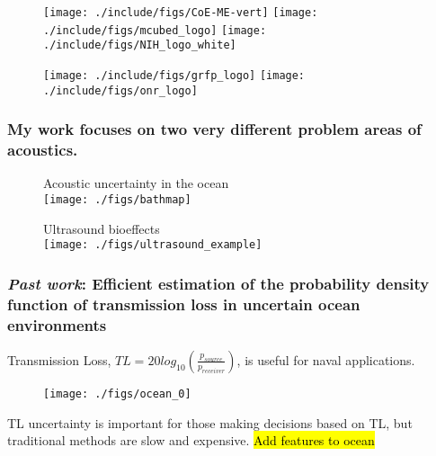 \begin{frame}
  \vfill
  \begin{figure}
    \centering
    \texttt{[image: ./include/figs/CoE-ME-vert]} \hfill
    \texttt{[image: ./include/figs/mcubed\_logo]} \hfill
    \texttt{[image: ./include/figs/NIH\_logo\_white]}\hfill
  \end{figure}
  \vfill
  \begin{figure}
    \centering
    \texttt{[image: ./include/figs/grfp\_logo]} \hfill
    \texttt{[image: ./include/figs/onr\_logo]} 
  \end{figure}
  \vfill
\end{frame}
\begin{frame} \frametitle{My work focuses on two very different problem areas of acoustics.}
  \begin{minipage}{0.48\textwidth}
    \begin{figure}
      Acoustic uncertainty in the ocean \vspace*{4pt}\\
      \centering
      \texttt{[image: ./figs/bathmap]}
    \end{figure}
  \end{minipage}
  \hfill
  \begin{minipage}{0.48\textwidth}
    \begin{figure}
      \centering
      Ultrasound bioeffects \vspace*{4pt}\\
      \texttt{[image: ./figs/ultrasound\_example]}
    \end{figure}
  \end{minipage}
\end{frame}
\begin{frame} \frametitle{\textit{Past work}: Efficient estimation of the probability density function of transmission loss in uncertain ocean environments}
  {\small
    \vspace*{0.25cm}
    Transmission Loss, $TL=20log_{10}\left(\frac{p_{source}}{p_{receiver}}\right)$, is useful for naval applications.
    \vspace*{0.25cm}
    \begin{figure}
      \centering
      \texttt{[image: ./figs/ocean\_0]}
    \end{figure}
    TL uncertainty is important for those making decisions based on TL,
    but traditional methods are slow and expensive.  \hl{Add features to
      ocean} }
\end{frame}
